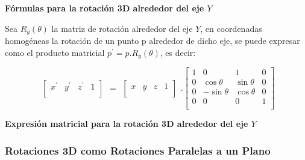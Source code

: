 \begin{center}
\textbf{\footnotesize{Fórmulas para la rotación 3D alrededor del eje $Y$}}
\end{center}


Sea $R_{y}( \theta )$ la matriz de rotación alrededor del eje $Y$, en coordenadas homogéneas la rotación de un punto p alrededor de dicho eje, se puede expresar como el producto matricial $p^{\prime} = p.R_{y}(\theta)$, es decir:

\begin{equation}
\begin{array}{rccl}
\left[
\begin{array}{rccl}
{x}^{\prime} & {y}^{\prime} & {z}^{\prime} & 1\\
\end{array}
\right]
\end{array}
=
\begin{array}{rccl}
\left[
\begin{array}{rccl}
x & y & z & 1\\
\end{array}
\right]
\end{array} 
.
\left[
\begin{array}{rccl}
1 & 0 & 1 & 0\\
0 & \cos\theta & \sin\theta &  0\\
0 & -\sin\theta & \cos\theta & 0 \\
0 & 0 & 0 & 1\\
\end{array}
\right]
\end{equation}

\begin{center}
\textbf{\footnotesize{Expresión matricial para la rotación 3D alrededor del eje $Y$}}
\end{center}

\subsubsection{Rotaciones 3D como Rotaciones Paralelas a un Plano}

